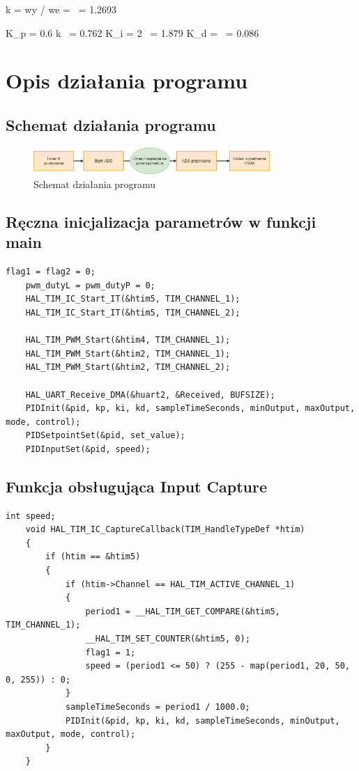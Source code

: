 \documentclass[10pt, a4paper]{article}
\begin{document}
\hspace{-0.55cm} k = \Delta wy / \Delta we =  \ = 1.2693  \newline

\hspace{-0.55cm} K_{p} = 0.6 \ast k \ = 0.762 \newline
K_{i} = 2 \ast {} \ = 1.879 \newline
K_{d} =  \ = 0.086 \newline

\section{Opis działania programu}

\subsection{Schemat działania programu}
	\begin{figure}[H]
		\centering
		\includegraphics[width=0.8\textwidth]{figures/diagramPWM.png}
		\caption{Schemat działania programu}
		\label{fig:diagramPWM}
	\end{figure}

\subsection{Ręczna inicjalizacja parametrów w funkcji main}
	\begin{lstlisting}[tabsize=2]
	flag1 = flag2 = 0;
	pwm_dutyL = pwm_dutyP = 0;
	HAL_TIM_IC_Start_IT(&htim5, TIM_CHANNEL_1);
	HAL_TIM_IC_Start_IT(&htim5, TIM_CHANNEL_2);
	
	HAL_TIM_PWM_Start(&htim4, TIM_CHANNEL_1);
	HAL_TIM_PWM_Start(&htim2, TIM_CHANNEL_1);
	HAL_TIM_PWM_Start(&htim2, TIM_CHANNEL_2);
	
	HAL_UART_Receive_DMA(&huart2, &Received, BUFSIZE);
	PIDInit(&pid, kp, ki, kd, sampleTimeSeconds, minOutput, maxOutput, mode, control);
	PIDSetpointSet(&pid, set_value);
	PIDInputSet(&pid, speed);
	\end{lstlisting}

\subsection{Funkcja obsługująca Input Capture}
	\begin{lstlisting}[tabsize=2]
	int speed;
	void HAL_TIM_IC_CaptureCallback(TIM_HandleTypeDef *htim)
	{
		if (htim == &htim5)
		{
			if (htim->Channel == HAL_TIM_ACTIVE_CHANNEL_1)
			{
				period1 = __HAL_TIM_GET_COMPARE(&htim5, TIM_CHANNEL_1);
				__HAL_TIM_SET_COUNTER(&htim5, 0);
				flag1 = 1;
				speed = (period1 <= 50) ? (255 - map(period1, 20, 50, 0, 255)) : 0;
			}
			sampleTimeSeconds = period1 / 1000.0;
			PIDInit(&pid, kp, ki, kd, sampleTimeSeconds, minOutput, maxOutput, mode, control);
		}
	}
	\end{lstlisting}
\end{document}
